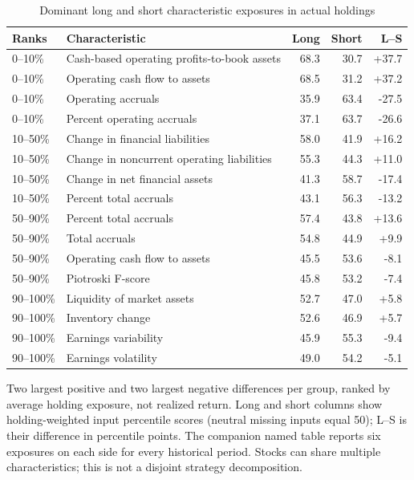 \begin{table}[p]\centering\small{}
\caption{Dominant long and short characteristic exposures in actual holdings}\label{tab:dominant}
\begin{tabular}{lp{3.05in}rrr}
\toprule
Ranks & Characteristic & Long & Short & L--S \\
\midrule
0--10\% & Cash-based operating profits-to-book assets & 68.3 & 30.7 & +37.7 \\
0--10\% & Operating cash flow to assets & 68.5 & 31.2 & +37.2 \\
0--10\% & Operating accruals & 35.9 & 63.4 & -27.5 \\
0--10\% & Percent operating accruals & 37.1 & 63.7 & -26.6 \\
10--50\% & Change in financial liabilities & 58.0 & 41.9 & +16.2 \\
10--50\% & Change in noncurrent operating liabilities & 55.3 & 44.3 & +11.0 \\
10--50\% & Change in net financial assets & 41.3 & 58.7 & -17.4 \\
10--50\% & Percent total accruals & 43.1 & 56.3 & -13.2 \\
50--90\% & Percent total accruals & 57.4 & 43.8 & +13.6 \\
50--90\% & Total accruals & 54.8 & 44.9 & +9.9 \\
50--90\% & Operating cash flow to assets & 45.5 & 53.6 & -8.1 \\
50--90\% & Piotroski F-score & 45.8 & 53.2 & -7.4 \\
90--100\% & Liquidity of market assets & 52.7 & 47.0 & +5.8 \\
90--100\% & Inventory change & 52.6 & 46.9 & +5.7 \\
90--100\% & Earnings variability & 45.9 & 55.3 & -9.4 \\
90--100\% & Earnings volatility & 49.0 & 54.2 & -5.1 \\
\bottomrule\end{tabular}\par\vspace{5pt}
\begin{minipage}{\textwidth}\footnotesize Two largest positive and two largest negative differences per group, ranked by average holding exposure, not realized return. Long and short columns show holding-weighted input percentile scores (neutral missing inputs equal 50); L--S is their difference in percentile points. The companion named table reports six exposures on each side for every historical period. Stocks can share multiple characteristics; this is not a disjoint strategy decomposition.\end{minipage}\end{table}
